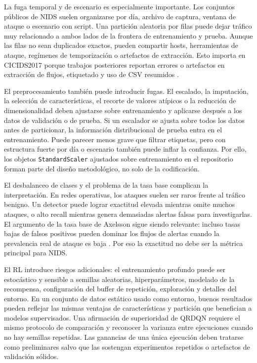 La fuga temporal y de escenario es especialmente importante. Los conjuntos públicos de NIDS suelen organizarse por día, archivo de captura, ventana de ataque o escenario con script. Una partición aleatoria por filas puede dejar tráfico muy relacionado a ambos lados de la frontera de entrenamiento y prueba. Aunque las filas no sean duplicados exactos, pueden compartir hosts, herramientas de ataque, regímenes de temporización o artefactos de extracción. Esto importa en CICIDS2017 porque trabajos posteriores reportan errores o artefactos en extracción de flujos, etiquetado y uso de CSV resumidos \parencite{Engelen2021CICIDSIssues,Lanvin2023Errors,Liu2022ErrorPrevalenceNIDS,Rosay2022CICIDS2017Analysis,Dube2024FaultyCICIDS2017}.

El preprocesamiento también puede introducir fugas. El escalado, la imputación, la selección de características, el recorte de valores atípicos o la reducción de dimensionalidad deben ajustarse sobre entrenamiento y aplicarse después a los datos de validación o de prueba. Si un escalador se ajusta sobre todos los datos antes de particionar, la información distribucional de prueba entra en el entrenamiento. Puede parecer menos grave que filtrar etiquetas, pero con estructura fuerte por día o escenario también puede inflar la confianza. Por ello, los objetos \texttt{StandardScaler} ajustados sobre entrenamiento en el repositorio forman parte del diseño metodológico, no solo de la codificación.

El desbalanceo de clases y el problema de la tasa base complican la interpretación. En redes operativas, los ataques suelen ser raros frente al tráfico benigno. Un detector puede lograr exactitud elevada mientras omite muchos ataques, o alto recall mientras genera demasiadas alertas falsas para investigarlas. El argumento de la tasa base de Axelsson sigue siendo relevante: incluso tasas bajas de falsos positivos pueden dominar los flujos de alertas cuando la prevalencia real de ataque es baja \parencite{Axelsson1999BaseRate}. Por eso la exactitud no debe ser la métrica principal para NIDS.

El RL introduce riesgos adicionales: el entrenamiento profundo puede ser estocástico y sensible a semillas aleatorias, hiperparámetros, modelado de la recompensa, configuración del buffer de repetición, exploración y detalles del entorno. En un conjunto de datos estático usado como entorno, buenos resultados pueden reflejar las mismas ventajas de características y partición que benefician a modelos supervisados. Una afirmación de superioridad de QRDQN requiere el mismo protocolo de comparación y reconocer la varianza entre ejecuciones cuando no hay semillas repetidas. Las ganancias de una única ejecución deben tratarse como preliminares salvo que las sostengan experimentos repetidos o artefactos de validación sólidos.

